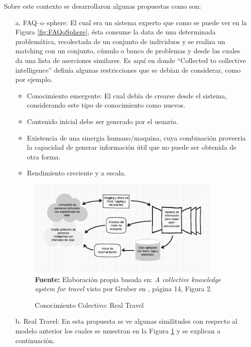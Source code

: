 \documentclass[oneside,12pt,a4paper]{memoir}%
\begin{document}
	Sobre este contexto se desarrollaron algunas propuestas como son:
	\begin{itemize}
	  \item [a.] FAQ--o--sphere: El cual era un sistema experto que como se puede
	  ver en la Figura \ref{fig:FAQoSphere}, \'esta consume la data de una determinada
	  problem\'atica, recolectada de un conjunto de individuos y se realiza un
	  matching con un conjunto, c\'umulo o banco de problemas y desde las cuales da
	  una lista de aserciones similares. Es aqu\'i en donde ``Collected to
	  collective intelligence'' defin\'ia algunas restricciones que se deb\'ian de
	  considerar, como por ejemplo.
	  
	  \begin{itemize}
	    \item Conocimiento emergente: El cual deb\'ia de crearse desde el sistema,
	    considerando este tipo de conocimiento como nuevos.
	    \item Contenido inicial debe ser generado por el usuario.
	    \item Existencia de una sinergia humano/maquina, cuya combinaci\'on
	    proveer\'ia la capacidad de generar informaci\'on \'util que no puede ser
	    obtenida de otra forma.
	    \item Rendimiento creciente y a escala. 
	  \end{itemize}  
	    
	  \begin{figure}[here]
		\centering
		\caption{Conocimiento Colectivo: Real Travel}
		\includegraphics[width=0.9\textwidth]{figure/fig_realTravel.png} 
		\newline
		\textbf{Fuente:} Elaboraci\'on propia basada en: \textit{A collective
		knowledge system for travel} visto por Gruber en \cite{Gruber2008}, p\'agina
		14, Figura 2.
		\label{fig:realTravel}
	  \end{figure}
	
	  \item [b.] Real Travel: En esta propuesta se ve algunas similitudes con
	  respecto al modelo anterior los cuales se muestran en la Figura
	  \ref{fig:realTravel} y se explican a continuaci\'on.
	  

\end{itemize}
\end{document}
